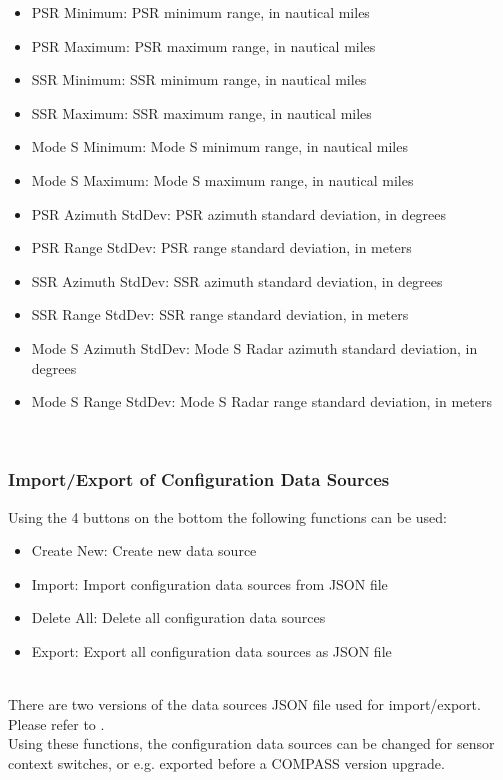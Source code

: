 \begin{itemize}
\item PSR Minimum: PSR minimum range, in nautical miles
\item PSR Maximum: PSR maximum range, in nautical miles
\item SSR Minimum: SSR minimum range, in nautical miles
\item SSR Maximum: SSR maximum range, in nautical miles
\item Mode S Minimum: Mode S minimum range, in nautical miles
\item Mode S Maximum: Mode S maximum range, in nautical miles
\item PSR Azimuth StdDev: PSR azimuth standard deviation, in degrees
\item PSR Range StdDev: PSR range standard deviation, in meters
\item SSR Azimuth StdDev: SSR azimuth standard deviation, in degrees
\item SSR Range StdDev: SSR range standard deviation, in meters
\item Mode S Azimuth StdDev: Mode S Radar azimuth standard deviation, in degrees
\item Mode S Range StdDev: Mode S Radar range standard deviation, in meters
\end{itemize}
\ \\

\subsubsection{Import/Export of Configuration Data Sources}
\label{sec:config_ds_export}

Using the 4 buttons on the bottom the following functions can be used:

\begin{itemize}
\item Create New: Create new data source
\item Import: Import configuration data sources from JSON file
\item Delete All: Delete all configuration data sources
\item Export: Export all configuration data sources as JSON file
\end{itemize}
\ \\

There are two versions of the data sources JSON file used for import/export. Please refer to . \\

Using these functions, the configuration data sources can be changed for sensor context switches, or e.g. exported before a COMPASS version upgrade.
